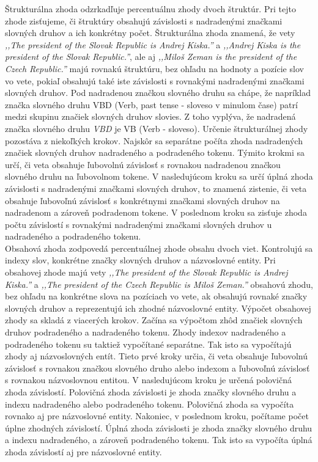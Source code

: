 Štrukturálna zhoda odzrkadľuje percentuálnu zhody dvoch štruktúr. Pri tejto zhode zisťujeme, či štruktúry obsahujú závislosti s nadradenými značkami slovných druhov a ich konkrétny počet. Štrukturálna zhoda znamená, že vety \textit{,,The president of the Slovak Republic is Andrej Kiska.''} a \textit{,,Andrej Kiska is the president of the Slovak Republic.''}, ale aj \textit{,,Miloš Zeman is the president of the Czech Republic.''} majú rovnakú štruktúru, bez ohľadu na hodnoty a pozície slov vo vete, pokiaľ obsahujú také iste závislosti s rovnakými nadradenými značkami slovných druhov. Pod nadradenou značkou slovného druhu sa chápe, že napríklad značka slovného druhu VBD (Verb, past tense - sloveso v minulom čase) patrí medzi skupinu značiek slovných druhov slovies. Z toho vyplýva, že nadradená značka slovného druhu \textit{VBD} je VB (Verb - sloveso). Určenie štrukturálnej zhody pozostáva z niekoľkých krokov. Najskôr sa separátne počíta zhoda nadradených značiek slovných druhov nadradeného a podradeného tokenu. Týmito krokmi sa určí, či veta obsahuje ľubovolnú závislosť s rovnakou nadradenou značkou slovného druhu na ľubovolnom tokene. V nasledujúcom kroku sa určí úplná zhoda závislosti s nadradenými značkami slovných druhov, to znamená zistenie, či veta obsahuje ľubovoľnú závislosť s konkrétnymi značkami slovných druhov na nadradenom a zároveň podradenom tokene. V poslednom kroku sa zisťuje zhoda počtu závislostí s rovnakými nadradenými značkami slovných druhov u nadradeného a podradeného tokenu. \\

Obsahová zhoda zodpovedá percentuálnej zhode obsahu dvoch viet. Kontrolujú sa indexy slov, konkrétne značky slovných druhov a názvoslovné entity. Pri obsahovej zhode majú vety \textit{,,The president of the Slovak Republic is Andrej Kiska.''} a \textit{,,The president of the Czech Republic is Miloš Zeman.''} obsahovú zhodu, bez ohľadu na konkrétne slova na pozíciach vo vete, ak obsahujú rovnaké značky slovných druhov a reprezentujú ich zhodné názvoslovné entity. Výpočet obsahovej zhody sa skladá z viacerých krokov. Začína sa výpočtom zhôd značiek slovných druhov podradeného a nadradeného tokenu. Zhody indexov nadradeného a podradeného tokenu su taktiež vypočítané separátne. Tak isto sa vypočítajú zhody aj názvoslovných entít. Tieto prvé kroky určia, či veta obsahuje ľubovolnú závislosť s rovnakou značkou slovného druho alebo indexom a ľubovoľnú závislosť s rovnakou názvoslovnou entitou. V nasledujúcom kroku je určená polovičná zhoda závislostí. Polovičná zhoda závislosti je zhoda značky slovného druhu a indexu nadradeného alebo podradeného tokenu. Polovičná zhoda sa vypočíta rovnako aj pre názvoslovné entity. Nakoniec, v poslednom kroku, počítame počet úplne zhodných závislostí. Úplná zhoda závislosti je zhoda značky slovného druhu a indexu nadradeného, a zároveň podradeného tokenu. Tak isto sa vypočíta úplná zhoda závislostí aj pre názvoslovné entity. \\

